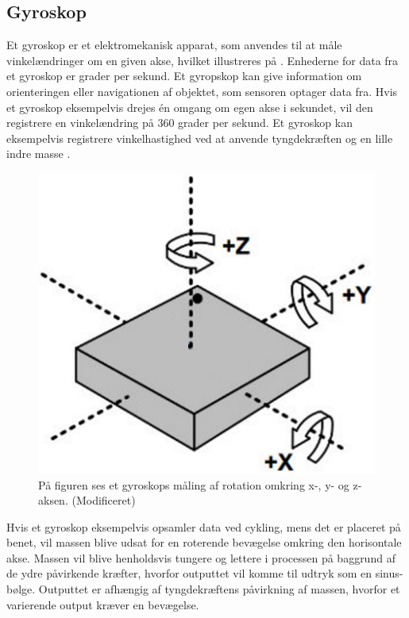 \subsection{Gyroskop}
Et gyroskop er et elektromekanisk apparat, som anvendes til at måle vinkelændringer om en given akse, hvilket illustreres på . Enhederne for data fra et gyroskop er grader per sekund. Et gyropskop kan give information om orienteringen eller navigationen af objektet, som sensoren optager data fra. Hvis et gyroskop eksempelvis drejes én omgang om egen akse i sekundet, vil den registrere en vinkelændring på 360 grader per sekund. \citep{Sparkfun_gyro,Barbour2014} \newline
Et gyroskop kan eksempelvis registrere vinkelhastighed ved at anvende tyngdekræften og en lille indre masse \citep{Sparkfun_gyro,Barbour2014}.
\begin{figure}[H]
	\centering
	\includegraphics[scale=0.6]{figures/bProblemloesning/gyro.png}
	\caption{På figuren ses et gyroskops måling af rotation omkring x-, y- og z-aksen. \citep{Sparkfun_gyro} (Modificeret)}
	\label{fig:gyro}
\end{figure}\vspace{-.2cm}
Hvis et gyroskop eksempelvis opsamler data ved cykling, mens det er placeret på benet, vil massen blive udsat for en roterende bevægelse omkring den horisontale akse. Massen vil blive henholdsvis tungere og lettere i processen på baggrund af de ydre påvirkende kræfter, hvorfor outputtet vil komme til udtryk som en sinus-bølge. Outputtet er afhængig af tyngdekræftens påvirkning af massen, hvorfor et varierende output kræver en bevægelse. \citep{TittertonWeston2004,LuingeVeltink2005}
